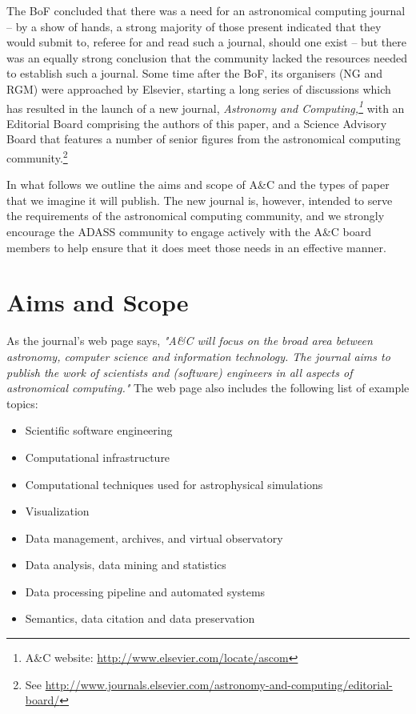 The BoF concluded that there was a need for an astronomical computing journal -- by a show of hands, a strong majority of those present indicated that they would submit to, referee for and read such a journal, should one exist -- but there was an equally strong conclusion that the community lacked the resources needed to establish such a journal. Some time after the BoF, its organisers (NG and RGM) were approached by Elsevier, starting a long series of discussions which has resulted in the launch of a new journal, {\em Astronomy and Computing,\footnote{A\&C website: \url{ http://www.elsevier.com/locate/ascom}} \/} with an Editorial Board comprising the authors of this paper, and a Science Advisory Board that features a number of senior figures from the astronomical computing community.\footnote{See \url{http://www.journals.elsevier.com/astronomy-and-computing/editorial-board/}} 

In what follows we outline the aims and scope of A\&C and the types of paper that we imagine it will publish. The new journal is, however, intended to serve the requirements of the astronomical computing community, and we strongly encourage the ADASS community to engage actively with the A\&C board members to help ensure that it does meet those needs in an effective manner. 

\section{Aims and Scope}

As the journal's web page  says, {\em "A\&C will focus on the broad area between
astronomy, computer science and information technology. The journal
aims to publish the work of scientists and (software) engineers in all
aspects of astronomical computing."\/} The web page also includes the following list of example topics:
\begin{itemize}
\setlength{\itemsep}{1pt}
  \setlength{\parskip}{0pt}
  \setlength{\parsep}{0pt}

\item Scientific software engineering

\item Computational infrastructure

\item Computational techniques used for astrophysical simulations

\item Visualization

\item Data management, archives, and virtual observatory

\item Data analysis, data mining and statistics

 \item Data processing pipeline and automated systems

\item  Semantics, data citation and data preservation


\end{itemize}

